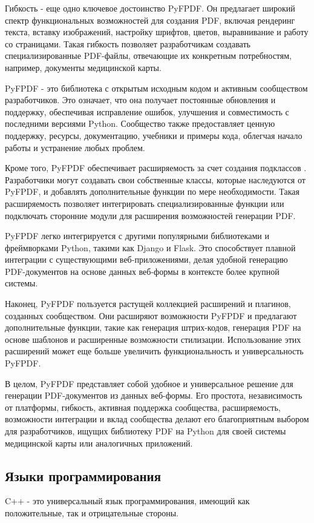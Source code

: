 Гибкость - еще одно ключевое достоинство PyFPDF. Он предлагает широкий спектр функциональных возможностей для создания PDF, включая рендеринг текста, вставку изображений, настройку шрифтов, цветов, выравнивание и работу со страницами. Такая гибкость позволяет разработчикам создавать специализированные PDF-файлы, отвечающие их конкретным потребностям, например, документы медицинской карты.

PyFPDF - это библиотека с открытым исходным кодом и активным сообществом разработчиков. Это означает, что она получает постоянные обновления и поддержку, обеспечивая исправление ошибок, улучшения и совместимость с последними версиями Python. Сообщество также предоставляет ценную поддержку, ресурсы, документацию, учебники и примеры кода, облегчая начало работы и устранение любых проблем.

Кроме того, PyFPDF обеспечивает расширяемость за счет создания подклассов \cite{3}. Разработчики могут создавать свои собственные классы, которые наследуются от PyFPDF, и добавлять дополнительные функции по мере необходимости. Такая расширяемость позволяет интегрировать специализированные функции или подключать сторонние модули для расширения возможностей генерации PDF.

PyFPDF легко интегрируется с другими популярными библиотеками и фреймворками Python, такими как Django и Flask. Это способствует плавной интеграции с существующими веб-приложениями, делая удобной генерацию PDF-документов на основе данных веб-формы в контексте более крупной системы.

Наконец, PyFPDF пользуется растущей коллекцией расширений и плагинов, созданных сообществом. Они расширяют возможности PyFPDF и предлагают дополнительные функции, такие как генерация штрих-кодов, генерация PDF на основе шаблонов и расширенные возможности стилизации. Использование этих расширений может еще больше увеличить функциональность и универсальность PyFPDF.

В целом, PyFPDF представляет собой удобное и универсальное решение для генерации PDF-документов из данных веб-формы. Его простота, независимость от платформы, гибкость, активная поддержка сообщества, расширяемость, возможности интеграции и вклад сообщества делают его благоприятным выбором для разработчиков, ищущих библиотеку PDF на Python для своей системы медицинской карты или аналогичных приложений.


\subsection{Языки программирования}
C++ - это универсальный язык программирования, имеющий как положительные, так и отрицательные стороны.

